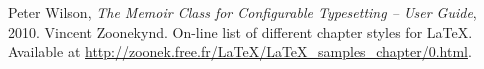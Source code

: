 \begin{thebibliography}{9}
 Peter Wilson, \emph{The Memoir Class for Configurable
  Typesetting -- User Guide}, 2010.
 Vincent Zoonekynd. On-line list of different chapter
  styles for \LaTeX. Available at
  \url{http://zoonek.free.fr/LaTeX/LaTeX_samples_chapter/0.html}. 
\end{thebibliography}



